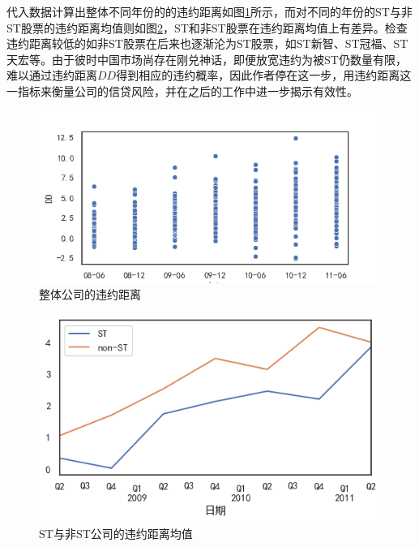 \documentclass[a4paper,12pt]{ctexart}
\begin{document}
代入数据计算出整体不同年份的的违约距离如图\ref{fig:dd}所示，而对不同的年份的ST与非ST股票的违约距离均值则如图\ref{fig:st}，ST和非ST股票在违约距离均值上有差异。检查违约距离较低的如非ST股票在后来也逐渐沦为ST股票，如ST新智、ST冠福、ST天宏等。由于彼时中国市场尚存在刚兑神话，即便放宽违约为被ST仍数量有限，难以通过违约距离$DD$得到相应的违约概率，因此作者停在这一步，用违约距离这一指标来衡量公司的信贷风险，并在之后的工作\cite{彭伟2012我国上市中小企业信贷风险研究}中进一步揭示有效性。
\begin{figure}[H]
    \includegraphics[width=\linewidth]{img/dd.png}
    \caption{整体公司的违约距离}\label{fig:dd}
\end{figure}
\begin{figure}[H]
    \includegraphics[width=\linewidth]{img/st-vs-non-st.png}
    \caption{ST与非ST公司的违约距离均值}\label{fig:st}
\end{figure}
\end{document}
